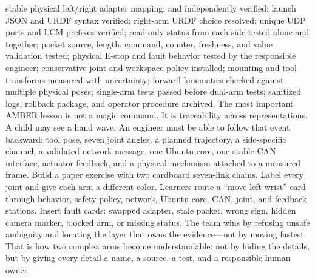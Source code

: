 \markdownRendererUlItem \markdownRendererUntickedBox{} stable physical left/right adapter mapping;\markdownRendererUlItemEnd 
\markdownRendererUlItem \markdownRendererUntickedBox{}  and  independently verified;\markdownRendererUlItemEnd 
\markdownRendererUlItem \markdownRendererUntickedBox{} launch JSON and URDF syntax verified;\markdownRendererUlItemEnd 
\markdownRendererUlItem \markdownRendererUntickedBox{} right-arm URDF choice resolved;\markdownRendererUlItemEnd 
\markdownRendererUlItem \markdownRendererUntickedBox{} unique UDP ports and LCM prefixes verified;\markdownRendererUlItemEnd 
\markdownRendererUlItem \markdownRendererUntickedBox{} read-only status from each side tested alone and together;\markdownRendererUlItemEnd 
\markdownRendererUlItem \markdownRendererUntickedBox{} packet source, length, command, counter, freshness, and value validation tested;\markdownRendererUlItemEnd 
\markdownRendererUlItem \markdownRendererUntickedBox{} physical E-stop and fault behavior tested by the responsible engineer;\markdownRendererUlItemEnd 
\markdownRendererUlItem \markdownRendererUntickedBox{} conservative joint and workspace policy installed;\markdownRendererUlItemEnd 
\markdownRendererUlItem \markdownRendererUntickedBox{} mounting and tool transforms measured with uncertainty;\markdownRendererUlItemEnd 
\markdownRendererUlItem \markdownRendererUntickedBox{} forward kinematics checked against multiple physical poses;\markdownRendererUlItemEnd 
\markdownRendererUlItem \markdownRendererUntickedBox{} single-arm tests passed before dual-arm tests;\markdownRendererUlItemEnd 
\markdownRendererUlItem \markdownRendererUntickedBox{} sanitized logs, rollback package, and operator procedure archived.\markdownRendererUlItemEnd 
\markdownRendererUlEnd \markdownRendererInterblockSeparator
{}
\markdownRendererSectionEnd \markdownRendererSectionBegin
{}\markdownRendererInterblockSeparator
{}The most important AMBER lesson is not a magic command. It is traceability across representations. A child may see a hand wave. An engineer must be able to follow that event backward: tool pose, seven joint angles, a planned trajectory, a side-specific channel, a validated network message, one Ubuntu core, one stable CAN interface, actuator feedback, and a physical mechanism attached to a measured frame.\markdownRendererParagraphSeparator
{}Build a paper exercise with two cardboard seven-link chains. Label every joint and give each arm a different color. Learners route a “move left wrist” card through behavior, safety policy, network, Ubuntu core, CAN, joint, and feedback stations. Insert fault cards: swapped adapter, stale packet, wrong sign, hidden camera marker, blocked arm, or missing status. The team wins by refusing unsafe ambiguity and locating the layer that owns the evidence—not by moving fastest.\markdownRendererParagraphSeparator
{}That is how two complex arms become understandable: not by hiding the details, but by giving every detail a name, a source, a test, and a responsible human owner.
\markdownRendererSectionEnd \markdownRendererDocumentEnd